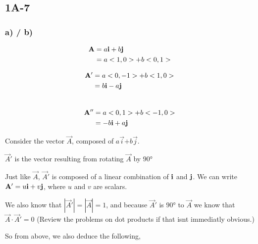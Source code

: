 \documentclass[main.tex]{subfiles}
\begin{document}
\subsection*{1A-7}


\subsubsection*{a) / b)}

\begin{align*}
\mathbf{A} &= a\mathbf{i} + b\mathbf{j}\\
&= a<1,0> + b<0,1>\\
\end{align*}

\begin{align*}
\mathbf{A'} &= a<0,-1> + b <1,0>\\
&= b\mathbf{i} -a\mathbf{j}\\
\end{align*}\\

\begin{align*}
\mathbf{A''} &= a<0,1> + b <-1,0>\\
&= - b \mathbf{i} + a\mathbf{j}\\
\end{align*}



Consider the vector {\color{1}$\vec{A}$},
composed of {\color{2}$a\vec{i}$}$ +
${\color{3}$b\vec{j}$}.

$\vec{A}'$ is the vector resulting from rotating {\color{1}$\vec{A}$} by $\ang{90}$


Just like $\vec{A}$, $\vec{A}'$ is composed of a linear combination
of $\mathbf{i}$ and $\mathbf{j}$.
We can write $\mathbf{A}' = u\mathbf{i} + v\mathbf{j}$, where $u$ and $v$ are scalars.

We also know that $|\vec{A}'| = |\vec{A}| = 1$, and because $\vec{A}'
$ is $\ang{90}$ to $\vec{A}$ we know that $\vec{A} \cdot \vec{A}' = 0$
(Review the problems on dot products if that isnt immediatly obvious.)


So from above, we also deduce the following,
\end{document}
